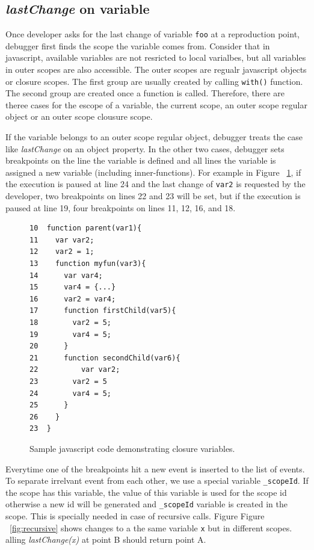 \documentclass[preprint]{sigplanconf}
\begin{document}
\subsection{\textit{lastChange} on variable} 
Once developer asks for the last change of variable \texttt{foo} at a reproduction point, debugger first finds the scope the variable comes from. Consider that in javascript, available variables are not resricted to local varialbes, but all variables in outer scopes are also accessible. The outer scopes are regualr javascript objects or closure scopes. The first group are usually created by calling \texttt{with()} function. The second group are created once a function is called. Therefore, there are theree cases for the escope of a variable, the current scope, an outer scope regular object or an outer scope clousure scope. 

If the variable belongs to an outer scope regular object, debugger treats the case like \textit{lastChange} on an object property. In the other two cases, debugger sets breakpoints on the line the variable is defined and all lines the variable is assigned a new variable (including inner-functions). For example in Figure ~\ref{fig:js-closure}, if the execution is paused at line 24 and the last change of \texttt{var2} is requested by the developer, two breakpoints on lines 22 and 23 will be set, but if the execution is paused at line 19, four breakpoints on lines 11, 12, 16, and 18.


\begin{figure}[htp]
\begin{verbatim}
10  function parent(var1){
11    var var2;
12    var2 = 1;
13    function myfun(var3){
14      var var4;
15      var4 = {...}
16      var2 = var4;
17      function firstChild(var5){
18        var2 = 5;
19        var4 = 5;
20      }  
21      function secondChild(var6){
22       	var var2;
23        var2 = 5			      
24        var4 = 5;	
25      }
26    }  
23  }    
\end{verbatim}
\caption{Sample javascript code demonstrating closure variables.}
\label{fig:js-closure}
\end{figure}


Everytime one of the breakpoints hit a new event is inserted to the list of events. To separate irrelvant event from each other, we use a special variable \texttt{\_scopeId}. If the scope has this variable, the value of this variable is used for the scope id otherwise a new id will be generated and \texttt{\_scopeId} variable is created in the scope. This is specially needed in case of recursive calls. Figure Figure ~\ref{fig:recursive} shows changes to a the same variable \texttt{x} but in different scopes. alling \textit{lastChange(x)} at point B should return point A.
\end{document}
